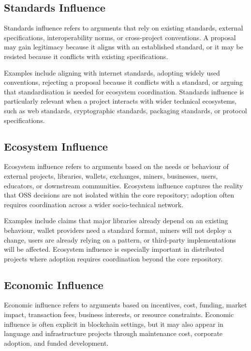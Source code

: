 \subsection{Standards Influence}

Standards influence refers to arguments that rely on existing standards, external specifications, interoperability norms, or cross-project conventions. A proposal may gain legitimacy because it aligns with an established standard, or it may be resisted because it conflicts with existing specifications.

Examples include aligning with internet standards, adopting widely used conventions, rejecting a proposal because it conflicts with a standard, or arguing that standardisation is needed for ecosystem coordination. Standards influence is particularly relevant when a project interacts with wider technical ecosystems, such as web standards, cryptographic standards, packaging standards, or protocol specifications.

\subsection{Ecosystem Influence}

Ecosystem influence refers to arguments based on the needs or behaviour of external projects, libraries, wallets, exchanges, miners, businesses, users, educators, or downstream communities. Ecosystem influence captures the reality that OSS decisions are not isolated within the core repository; adoption often requires coordination across a wider socio-technical network.

Examples include claims that major libraries already depend on an existing behaviour, wallet providers need a standard format, miners will not deploy a change, users are already relying on a pattern, or third-party implementations will be affected. Ecosystem influence is especially important in distributed projects where adoption requires coordination beyond the core repository.

\subsection{Economic Influence}

Economic influence refers to arguments based on incentives, cost, funding, market impact, transaction fees, business interests, or resource constraints. Economic influence is often explicit in blockchain settings, but it may also appear in language and infrastructure projects through maintenance cost, corporate adoption, and funded development.

